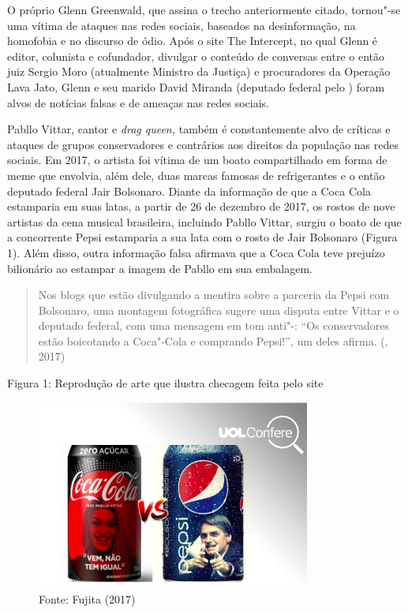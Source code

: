O próprio Glenn Greenwald, que assina o trecho anteriormente citado,
tornou"-se uma vítima de ataques nas redes sociais, baseados na
desinformação, na homofobia e no discurso de ódio. Após o site The
Intercept, no qual Glenn é editor, colunista e cofundador, divulgar o
conteúdo de conversas entre o então juiz Sergio Moro (atualmente
Ministro da Justiça) e procuradores da Operação Lava Jato, Glenn e seu
marido David Miranda (deputado federal pelo ) foram alvos de
notícias falsas e de ameaças nas redes sociais.

Pabllo Vittar, cantor e \emph{drag queen,} também é constantemente alvo
de críticas e ataques de grupos conservadores e contrários aos direitos
da população  nas redes sociais. Em 2017, o artista foi vítima de um
boato compartilhado em forma de meme que envolvia, além dele, duas
marcas famosas de refrigerantes e o então deputado federal Jair
Bolsonaro. Diante da informação de que a Coca Cola estamparia em suas
latas, a partir de 26 de dezembro de 2017, os rostos de nove artistas da
cena musical brasileira, incluindo Pabllo Vittar, surgiu o boato de que
a concorrente Pepsi estamparia a sua lata com o rosto de Jair Bolsonaro
(Figura 1). Além disso, outra informação falsa afirmava que a Coca Cola
teve prejuízo bilionário ao estampar a imagem de Pabllo em sua
embalagem.

\begin{quote}
Nos blogs que estão divulgando a mentira sobre a parceria da Pepsi com
Bolsonaro, uma montagem fotográfica sugere uma disputa entre Vittar e o
deputado federal, com uma mensagem em tom anti"-: ``Os conservadores
estão boicotando a Coca"-Cola e comprando Pepsi!'', um deles afirma.
(, 2017)
\end{quote}


Figura 1: Reprodução de arte que ilustra checagem feita pelo site 

\begin{figure}[!ht]
\centering
 \includegraphics[width=90mm]{./imgs/fig3.png}
\caption{Fonte: Fujita (2017)}
\end{figure}

